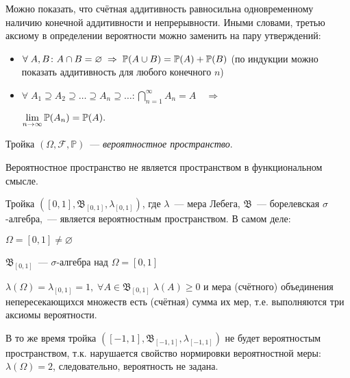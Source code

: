 \begin{rmrk}
    Можно показать, что счётная аддитивность равносильна одновременному наличию конечной аддитивности и непрерывности. Иными словами, третью аксиому в определении вероятности можно заменить на пару утверждений:
    \begin{itemize}
        \item $\forall \; A, B \colon A \cap B = \varnothing \; \Rightarrow \; {\mathbb{P}(A \cup B)} = {\mathbb{P}(A)} + {\mathbb{P}(B)}$ (по индукции можно показать аддитивность для любого конечного $n$)
        \item $ \forall \; A_1 \supseteq A_2 \supseteq \ldots \supseteq A_n \supseteq \ldots \colon \bigcap\limits_{n = 1}^{\infty} A_n
       = A \quad \Rightarrow$ 
       
       $\displaystyle \lim_{n \to \infty}{\mathbb{P}(A_n)} = {\mathbb{P}(A)}.$
    \end{itemize}
\end{rmrk}

\begin{defn}
    Тройка $(\Omega, \mathcal{F}, \mathbb{P})$~--- {\it вероятностное пространство}.
\end{defn}
\begin{rmrk}
    Вероятностное пространство не является пространством в функциональном смысле.
\end{rmrk}

\begin{exmp}
    Тройка $([0, 1], \mathfrak{B}_{[0, 1]}, \lambda_{[0, 1]})$, где $\lambda$~--- мера Лебега, $\mathfrak{B}$~--- борелевская $\sigma$-алгебра,~--- является вероятностным пространством. В самом деле:
    \begin{compactlist}
        \item $\Omega = [0, 1] \neq \varnothing$
        \item $\mathfrak{B}_{[0, 1]}$~--- $\sigma$-алгебра над $\Omega = [0, 1]$ 
        \item $\lambda(\Omega) = \lambda_{[0, 1]} = 1, \; \forall A \in \mathfrak{B}_{[0, 1]} \; \lambda(A) \geqslant 0$ и мера (счётного) объединения непересекающихся множеств есть (счётная) сумма их мер, т.е. выполняются три аксиомы вероятности.
    \end{compactlist}
    В то же время тройка $([-1, 1], \mathfrak{B}_{[-1, 1]}, \lambda_{[-1, 1]})$ не будет вероятностым пространством, т.к. нарушается свойство нормировки вероятностной меры: $\lambda(\Omega) = 2$, следовательно, вероятность не задана.
\end{exmp}

